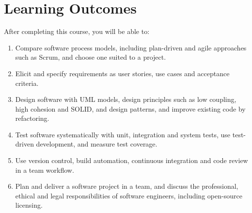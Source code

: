 \documentclass[11pt,a4paper]{article}
\begin{document}
\section{Learning Outcomes}
After completing this course, you will be able to:
\begin{enumerate}[label=LO\arabic*.]
  \item Compare software process models, including plan-driven and agile approaches such as Scrum, and choose one suited to a project.
  \item Elicit and specify requirements as user stories, use cases and acceptance criteria.
  \item Design software with UML models, design principles such as low coupling, high cohesion and SOLID, and design patterns, and improve existing code by refactoring.
  \item Test software systematically with unit, integration and system tests, use test-driven development, and measure test coverage.
  \item Use version control, build automation, continuous integration and code review in a team workflow.
  \item Plan and deliver a software project in a team, and discuss the professional, ethical and legal responsibilities of software engineers, including open-source licensing.
\end{enumerate}
\end{document}
